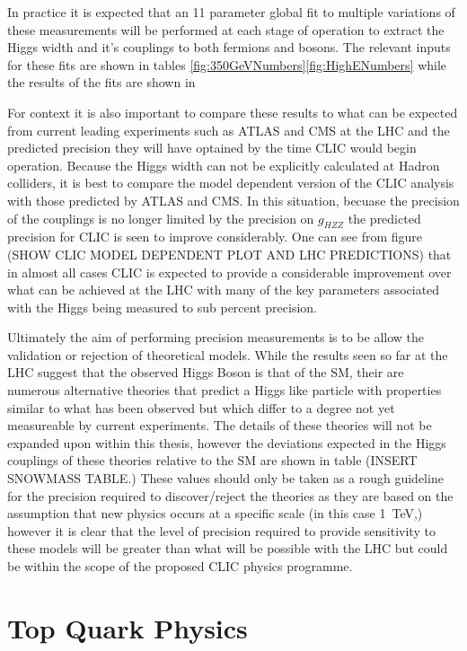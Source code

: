 In practice it is expected that an 11 parameter global fit to multiple variations of these measurements will be performed at each stage of operation to extract the Higgs width and it's couplings to both fermions and bosons. The relevant inputs for these fits are shown in tables \ref{fig:350GeVNumbers}\ref{fig:HighENumbers} while the results of the fits are shown in 

For context it is also important to compare these results to what can be expected from current leading experiments such as ATLAS and CMS at the LHC and the predicted precision they will have optained by the time CLIC would begin operation. Because the Higgs width can not be explicitly calculated at Hadron colliders, it is best to compare the model dependent version of the CLIC analysis with those predicted by ATLAS and CMS. In this situation, becuase the precision of the couplings is no longer limited by the precision on $g_{HZZ}$ the predicted precision for CLIC is seen to improve considerably. One can see from figure (SHOW CLIC MODEL DEPENDENT PLOT AND LHC PREDICTIONS) that in almost all cases CLIC is expected to provide a considerable improvement over what can be achieved at the LHC with many of the key parameters associated with the Higgs being measured to sub percent precision.

Ultimately the aim of performing precision measurements is to be allow the validation or rejection of theoretical models. While the results seen so far at the LHC suggest that the observed Higgs Boson is that of the \ac{SM}, their are numerous alternative theories that predict a Higgs like particle with properties similar to what has been observed but which differ to a degree not yet measureable by current experiments. The details of these theories will not be expanded upon within this thesis, however the deviations expected in the Higgs couplings of these theories relative to the \ac{SM} are shown in table (INSERT SNOWMASS TABLE.) These values should only be taken as a rough guideline for the precision required to discover/reject the theories as they are based on the assumption that new physics occurs at a specific scale (in this case 1~TeV,) however it is clear that the level of precision required to provide sensitivity to these models will be greater than what will be possible with the LHC but could be within the scope of the proposed CLIC physics programme.  


\section{Top Quark Physics}

